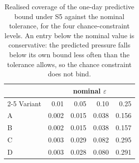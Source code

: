 \begin{table}[htbp]
\centering
\caption{Realised coverage of the one-day predictive bound under S5 against
the nominal tolerance, for the four chance-constraint levels. An entry below
the nominal value is conservative: the predicted pressure falls below its own
bound less often than the tolerance allows, so the chance constraint does not
bind.}
\label{tab:ch6-calibration-eps}
\begin{tabular}{@{}lrrrr@{}}
\toprule
& \multicolumn{4}{c}{nominal $\varepsilon$} \\
\cmidrule(r){2-5}
Variant & 0.01 & 0.05 & 0.10 & 0.25 \\
\midrule

A & 0.002 & 0.015 & 0.038 & 0.156 \\
B & 0.002 & 0.015 & 0.038 & 0.157 \\
C & 0.003 & 0.029 & 0.082 & 0.295 \\
D & 0.003 & 0.028 & 0.080 & 0.291 \\
\bottomrule
\end{tabular}
\end{table}

